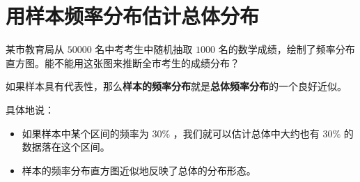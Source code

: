 \section*{用样本频率分布估计总体分布}


\begin{explore}


某市教育局从 $50000$ 名中考考生中随机抽取 $1000$ 名的数学成绩，绘制了频率分布直方图。能不能用这张图来推断全市考生的成绩分布？

\end{explore}

\begin{understand}


如果样本具有代表性，那么\textbf{样本的频率分布}就是\textbf{总体频率分布}的一个良好近似。

具体地说：
\begin{itemize}
  \item 如果样本中某个区间的频率为 $30\%$ ，我们就可以估计总体中大约也有 $30\%$ 的数据落在这个区间。
  \item 样本的频率分布直方图近似地反映了总体的分布形态。
\end{itemize}


\end{understand}

